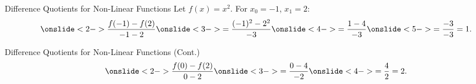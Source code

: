 \documentclass[Lecture.tex]{subfiles}
\begin{document}

\begin{frame}{Difference Quotients for Non-Linear Functions}
  Let $f(x) = x^2$. For $x_0 = -1$, $x_1 = 2$:
  $$\onslide<2->{\frac{f(-1) - f(2)}{-1 - 2}} \onslide<3->{= \frac{(-1)^2 - 2^2}{-3}} \onslide<4->{= \frac{1 - 4}{-3}} \onslide<5->{= \frac{-3}{-3} = 1.}$$
  \begin{center}
  \end{center}
\end{frame}

\begin{frame}{Difference Quotients for Non-Linear Functions (Cont.)}
  $$\onslide<2->{\frac{f(0) - f(2)}{0 - 2}} \onslide<3->{= \frac{0 - 4}{-2}} \onslide<4->{= \frac{4}{2} = 2.}$$
  \begin{center}
  \end{center}
\end{frame}
\end{document}
